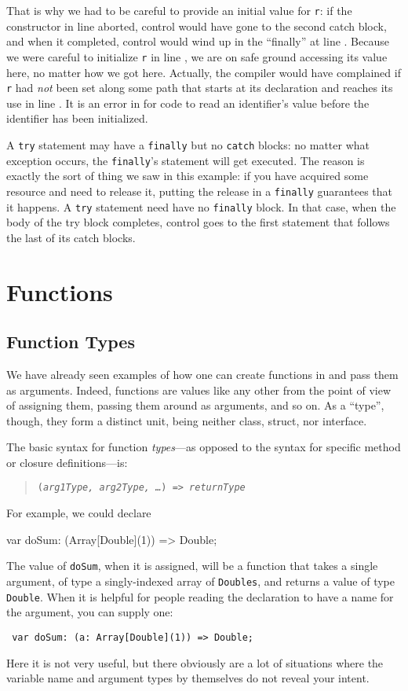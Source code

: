 \begin{description}
That is why we had to be careful to provide an initial value for {\tt r}: if the
constructor in line  aborted, control would have gone to the second catch block,
and when it completed, control would wind up in the ``finally'' at line .
Because we were careful to initialize {\tt r} in line , we are on safe ground
accessing its value here, no matter how we got here.  Actually, the compiler
would have complained if {\tt r} had {\em not} been set along some path that
starts at its declaration and reaches its use in line .  It is an error in
\Xten{} for code to read an identifier's value before the identifier has been
initialized.
\end{description}

A {\tt try} statement may have a {\tt finally} but no {\tt catch} blocks: no
matter what exception occurs, the {\tt finally}'s statement will get executed. 
The reason is exactly the sort of thing we saw in this example: if you have
acquired some resource and need to release it, putting the release
in a {\tt finally} guarantees that it happens. A {\tt try} statement
need have no {\tt finally} block. In that case, when the body of the try block
completes, control goes to the first statement that follows the last of its
catch blocks.

\section{Functions}
\subsection{Function Types}
We have already seen examples of how one can create functions in \Xten{} and
pass them as arguments.  Indeed, functions are values like any other from the
point of view of assigning them, passing them around as arguments, and so on. 
As a ``type'', though, they form a distinct unit, being neither class, struct,
nor interface.

The basic syntax for function {\em types}---as opposed to
the syntax for specific method or closure definitions---is:
\begin{quote}
{\tt ({\em arg1Type, arg2Type, \ldots}) => {\em returnType}}
\end{quote}
For example, we could declare
\begin{xten}
var doSum: (Array[Double](1)) => Double;
\end{xten}
The value of {\tt doSum}, when it is assigned, will be a function that
takes a single argument, of type a singly-indexed array of {\tt Doubles}, and
returns a value of type {\tt Double}.  When it is helpful for people reading the
declaration to have a name for the argument, you can supply one:
\begin{verbatim}
 var doSum: (a: Array[Double](1)) => Double;
\end{verbatim}
Here it is not very useful, but there obviously are a lot of situations where
the variable name and argument types by themselves do not reveal your intent.

